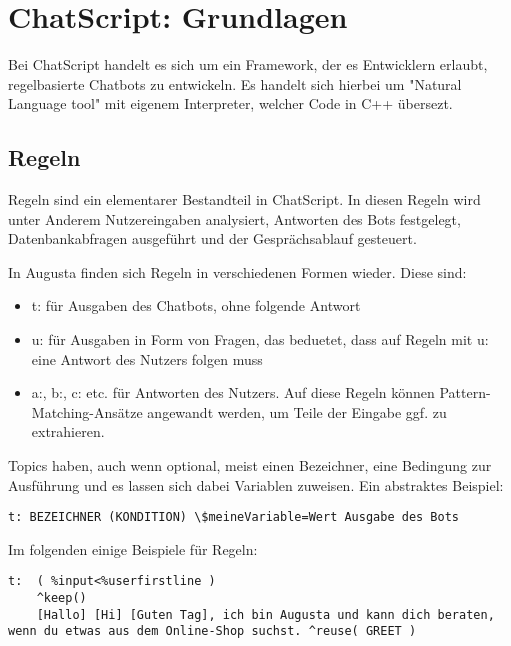 \chapter{ChatScript: Grundlagen}
\label{sec:ChatScript: Grundlagen}

Bei ChatScript handelt es sich um ein Framework, der es Entwicklern erlaubt, regelbasierte Chatbots zu entwickeln. Es handelt sich hierbei um "Natural Language tool" mit eigenem Interpreter, welcher Code in C++ übersezt. 


\section{Regeln}
\label{sec:ChatScript: Regeln}

Regeln sind ein elementarer Bestandteil in ChatScript. In diesen Regeln wird unter Anderem Nutzereingaben analysiert, Antworten des Bots festgelegt, Datenbankabfragen ausgeführt und der Gesprächsablauf gesteuert.  

In Augusta finden sich Regeln in verschiedenen Formen wieder. Diese sind: 

\begin{itemize}
\item t: für Ausgaben des Chatbots, ohne folgende Antwort 
\item u: für Ausgaben in Form von Fragen, das beduetet, dass auf Regeln mit u: eine Antwort des Nutzers folgen muss 
\item a:, b:, c: etc. für Antworten des Nutzers. Auf diese Regeln können Pattern-Matching-Ansätze angewandt werden, um Teile der Eingabe ggf. zu extrahieren.
\end{itemize}

Topics haben, auch wenn optional, meist einen Bezeichner, eine Bedingung zur Ausführung und es lassen sich dabei Variablen zuweisen. Ein abstraktes Beispiel:

\begin{lstlisting}[caption={Syntax für Regeln}]
t: BEZEICHNER (KONDITION) \$meineVariable=Wert Ausgabe des Bots
\end{lstlisting}

Im folgenden einige Beispiele für Regeln:

\begin{lstlisting}[caption={Beispiel für t:}]
t:  ( %input<%userfirstline )
    ^keep()
    [Hallo] [Hi] [Guten Tag], ich bin Augusta und kann dich beraten, wenn du etwas aus dem Online-Shop suchst. ^reuse( GREET )
\end{lstlisting}

